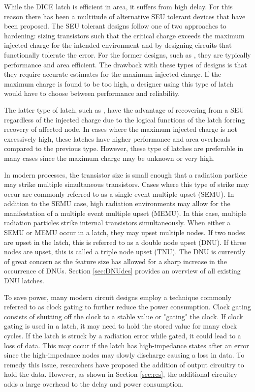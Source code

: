 While the DICE latch is efficient in area, it suffers from high delay. For this reason there has been a multitude of alternative SEU tolerant devices that have been proposed. The SEU tolerant designs follow one of two approaches to hardening: sizing transistors such that the critical charge exceeds the maximum injected charge for the intended environment and by designing circuits that functionally tolerate the error. For the former designs, such as \cite{NicoFeedback}, they are typically performance and area efficient. The drawback with these types of designs is that they require accurate estimates for the maximum injected charge. If the maximum charge is found to be too high, a designer using this type of latch would have to choose between performance and reliability. 

The latter type of latch, such as \cite{HIPER, FERST, Hazucha, SEMULatch, Multivdd, BISER}, have the advantage of recovering from a SEU regardless of the injected charge due to the logical functions of the latch forcing recovery of affected node. In cases where the maximum injected charge is not excessively high, these latches have higher performance and area overheads compared to the previous type. However, these type of latches are preferable in many cases since the maximum charge may be unknown or very high. 

In modern processes, the transistor size is small enough that a radiation particle may strike multiple simultaneous transistors. Cases where this type of strike may occur are commonly referred to as a single event multiple upset (SEMU). In addition to the SEMU case, high radiation environments may allow for the manifestation of a multiple event multiple upset (MEMU). In this case, multiple radiation particles strike internal transistors simultaneously. When either a SEMU or MEMU occur in a latch, they may upset multiple nodes. If two nodes are upset in the latch, this is referred to as a double node upset (DNU). If three nodes are upset, this is called a triple node upset (TNU). The DNU is currently of great concern as the feature size has allowed for a sharp increase in the occurrence of DNUs. Section \ref{sec:DNUdes} provides an overview of all existing DNU latches.     

To save power, many modern circuit designs employ a technique commonly referred to as clock gating to further reduce the power consumption. Clock gating consists of shutting off the clock to a stable value or "gating" the clock. If clock gating is used in a latch, it may need to hold the stored value for many clock cycles. If the latch is struck by a radiation error while gated, it could lead to a loss of data. This may occur if the latch has high-impedance states after an error since the high-impedance nodes may slowly discharge causing a loss in data. To remedy this issue, researchers have proposed the addition of output circuitry to hold the data. However, as shown in Section \ref{sec:res}, the additional circuitry adds a large overhead to the delay and power consumption.

